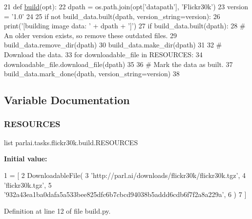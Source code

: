 \begin{DoxyCode}
21 \textcolor{keyword}{def }\hyperlink{namespacedialog__babi__feedback_1_1build_a7a9d289f7493a5ded13c4b7f071b6184}{build}(opt):
22     dpath = os.path.join(opt[\textcolor{stringliteral}{'datapath'}], \textcolor{stringliteral}{'Flickr30k'})
23     version = \textcolor{stringliteral}{'1.0'}
24 
25     \textcolor{keywordflow}{if} \textcolor{keywordflow}{not} build\_data.built(dpath, version\_string=version):
26         print(\textcolor{stringliteral}{'[building image data: '} + dpath + \textcolor{stringliteral}{']'})
27         \textcolor{keywordflow}{if} build\_data.built(dpath):
28             \textcolor{comment}{# An older version exists, so remove these outdated files.}
29             build\_data.remove\_dir(dpath)
30         build\_data.make\_dir(dpath)
31 
32         \textcolor{comment}{# Download the data.}
33         \textcolor{keywordflow}{for} downloadable\_file \textcolor{keywordflow}{in} RESOURCES:
34             downloadable\_file.download\_file(dpath)
35 
36         \textcolor{comment}{# Mark the data as built.}
37         build\_data.mark\_done(dpath, version\_string=version)
38 \end{DoxyCode}


\subsection{Variable Documentation}
\mbox{\label{namespaceparlai_1_1tasks_1_1flickr30k_1_1build_abd16c32208cabae507c611c0c7d641c9}} 
\subsubsection{\texorpdfstring{R\+E\+S\+O\+U\+R\+C\+ES}{RESOURCES}}
{\footnotesize\ttfamily list parlai.\+tasks.\+flickr30k.\+build.\+R\+E\+S\+O\+U\+R\+C\+ES}

{\bfseries Initial value\+:}
\begin{DoxyCode}
1 =  [
2     DownloadableFile(
3         \textcolor{stringliteral}{'http://parl.ai/downloads/flickr30k/flickr30k.tgz'},
4         \textcolor{stringliteral}{'flickr30k.tgz'},
5         \textcolor{stringliteral}{'932a43ea1ba0dafa5a533bee825dfc6b7cbcd94038b5addd6cdb6f7f2a8a229a'},
6     )
7 ]
\end{DoxyCode}


Definition at line 12 of file build.\+py.

